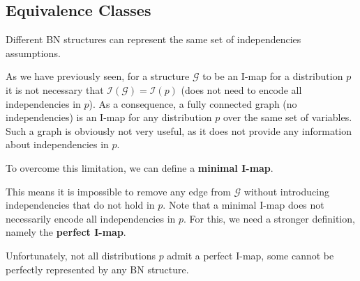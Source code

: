 \subsection{Equivalence Classes}
Different BN structures can represent the same set of independencies assumptions.
\begin{figure}[H]
\end{figure}
As we have previously seen, for a structure $\mathcal{G}$ to be an I-map for a distribution $p$ it is not necessary that $\mathcal{I}(\mathcal{G}) = \mathcal{I}(p)$ (does not need to encode all independencies in $p$).
As a consequence, a fully connected graph (no independencies) is an I-map for any distribution $p$ over the same set of variables. Such a graph is obviously not very useful, as it does not provide any information about independencies in $p$.

To overcome this limitation, we can define a \textbf{minimal I-map}.
\begin{figure}[H]
\end{figure}
This means it is impossible to remove any edge from $\mathcal{G}$ without introducing independencies that do not hold in $p$.
Note that a minimal I-map does not necessarily encode all independencies in $p$. 
For this, we need a stronger definition, namely the \textbf{perfect I-map}.
\begin{figure}[H]
\end{figure}
Unfortunately, not all distributions $p$ admit a perfect I-map, some cannot be perfectly represented by any BN structure.
